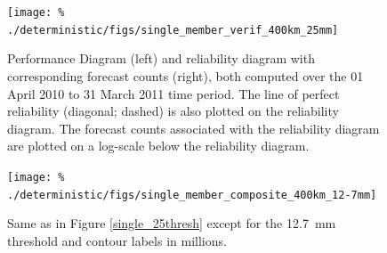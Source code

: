 \clearpage
\begin{figure}[cc]
    \centering
    \texttt{[image: \%
    ./deterministic/figs/single\_member\_verif\_400km\_25mm]}\\
    \caption{Performance Diagram (left) and reliability diagram with corresponding forecast counts (right), both computed over the 01 April 2010 to 31 March 2011 time period.
    The line of perfect reliability (diagonal; dashed) is also plotted on the reliability diagram.
    The forecast counts associated with the reliability diagram are plotted on a log-scale below the reliability diagram.}
    \label{single_verif_400km_25mm}
\end{figure}


\clearpage
\begin{figure}[cc]
    \centering
    \texttt{[image: \%
    ./deterministic/figs/single\_member\_composite\_400km\_12-7mm]}\\
    \caption{Same as in Figure \ref{single_25thresh} except for the \mbox{12.7 mm} threshold and contour labels in millions.}

    \label{single_12thresh}
\end{figure}


